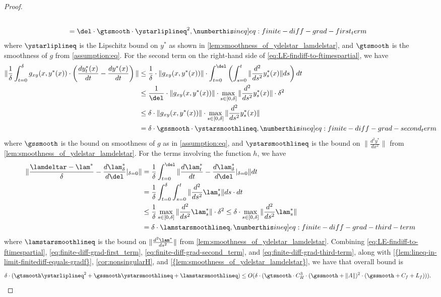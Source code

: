\begin{proof}
\begin{align*}
 \\
 &= \del\cdot\gtsmooth\cdot \ystarliplineq^2,\numberthis\label[ineq]{eq:finite-diff-grad-first_term}
 \end{align*} where $\ystarliplineq$ is the Lipschitz bound on $y^*$ as shown in \cref{lem:smoothness_of_ydelstar_lamdelstar}, and $\gtsmooth$ is the smoothness of $g$ from
 \cref{assumption:eq}.
 For the second term on the right-hand side of \cref{eq:LE-findiff-to-ftimespartial}, we have  
 \begin{align*}
\|\frac{1}{\delta}\int_{t=0}^{\delta}g_{xy}(x,y^{*}(x))\cdot\left(\frac{dy_{t}^{*}(x)}{dt}-\frac{dy^{*}(x)}{dt}\right)\| & \leq\frac{1}{\delta}\cdot\|g_{xy}(x,y^{*}(x))\|\cdot\int_{t=0}^{\del}\left(\int_{s=0}^{t}\|\frac{d^{2}}{ds^{2}}y_{s}^{*}(x)\|ds\right)dt \\
 & \leq\frac{1}{\del}\cdot\|g_{xy}(x,y^{*}(x))\|\cdot\max_{s\in[0,\delta]}\|\frac{d^{2}}{ds^{2}}y_{s}^{*}(x)\|\cdot\delta^{2} \\
 & \leq\delta\cdot\|g_{xy}(x,y^{*}(x))\|\cdot\max_{s\in[0,\delta]}\|\frac{d^{2}}{ds^{2}}y_{s}^{*}(x)\|\\
 &= \delta\cdot \gssmooth\cdot \ystarsmoothlineq, \numberthis\label[ineq]{eq:finite-diff-grad-second_term} 
\end{align*} where $\gssmooth$ is the bound on smoothness of $g$ as in
\cref{assumption:eq},
and $\ystarsmoothlineq$ is the bound on $\|\frac{d^2y^*}{dx^2}\|$ from \cref{lem:smoothness_of_ydelstar_lamdelstar}. 
For the terms involving the function $h$, we have \begin{align*}
\|\frac{\lamdeltar-\lam^{*}}{\delta}-\frac{d\lam_{\delta}^{*}}{d\del}|_{\delta=0}\| & =\frac{1}{\delta}\int_{t=0}^{\del}\|\frac{d\lam_{t}^{*}}{dt}-\frac{d\lam_{\delta}^{*}}{d\del}|_{\delta=0}\|dt\\
 & =\frac{1}{\delta}\int_{t=0}^{\delta}\int_{s=0}^{t}\|\frac{d^{2}}{ds^{2}}\lam_{s}^{*} \| ds\cdot dt\\
 & \leq\frac{1}{\delta}\max_{s\in[0,\delta]}\|\frac{d^{2}}{ds^{2}}\lam_{s}^{*}\|\cdot\delta^{2}\leq\delta\cdot\max_{s\in[0,\delta]}\|\frac{d^{2}}{ds^{2}}\lam_{s}^{*}\|\\
 &= \delta\cdot \lamstarsmoothlineq,\numberthis\label[ineq]{eq:finite-diff-grad-third-term}
\end{align*} where $\lamstarsmoothlineq$ is the bound on $\|\frac{d^2 \lam^*}{ds^2}\|$ from \cref{lem:smoothness_of_ydelstar_lamdelstar}. 
Combining  \cref{eq:LE-findiff-to-ftimespartial}, \cref{eq:finite-diff-grad-first_term}, \cref{eq:finite-diff-grad-second_term}, and \cref{eq:finite-diff-grad-third-term}, along with \cref{{lem:lineq-in-limit-finitediff-equals-gradf}}, \cref{cor:nonsingularH}, and  \cref{{lem:smoothness_of_ydelstar_lamdelstar}}, we have that overall bound is \begin{align*}\delta\cdot( \gtsmooth \ystarliplineq^2 + \gssmooth \ystarsmoothlineq + \lamstarsmoothlineq) &\leq O(\delta\cdot(\gtsmooth \cdot C_H^3 \cdot (\gssmooth + \|A\|)^2\cdot(\gssmooth+C_f + L_f))).\end{align*} 

\end{proof}
